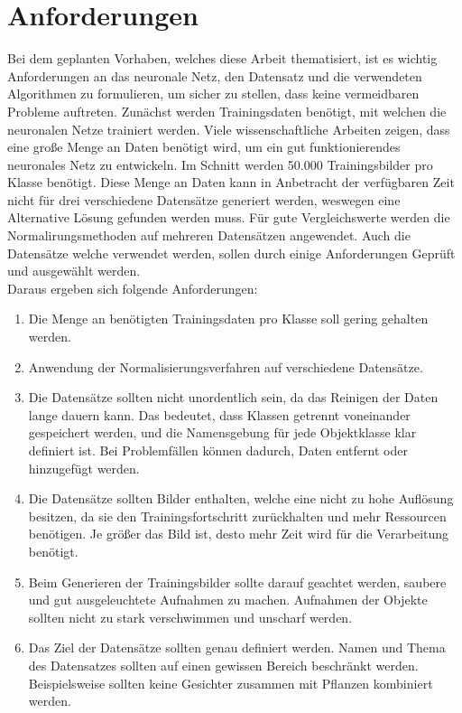 \section{Anforderungen}\label{s.anforderungen}
Bei dem geplanten Vorhaben, welches diese Arbeit thematisiert, ist es wichtig Anforderungen an das neuronale Netz, den Datensatz und die verwendeten Algorithmen zu formulieren, um sicher zu stellen, dass keine vermeidbaren Probleme auftreten. Zunächst werden Trainingsdaten benötigt, mit welchen die neuronalen Netze trainiert werden. Viele wissenschaftliche Arbeiten zeigen, dass eine große Menge an Daten benötigt wird, um ein gut funktionierendes neuronales Netz zu entwickeln. Im Schnitt werden 50.000 Trainingsbilder pro Klasse benötigt. Diese Menge an Daten kann in Anbetracht der verfügbaren Zeit nicht für drei verschiedene Datensätze generiert werden, weswegen eine Alternative Lösung gefunden werden muss. Für gute Vergleichswerte werden die Normalirungsmethoden auf mehreren Datensätzen angewendet. Auch die Datensätze welche verwendet werden, sollen durch einige Anforderungen Geprüft und ausgewählt werden.\\  
Daraus ergeben sich folgende Anforderungen:
\begin{enumerate} 
\item Die Menge an benötigten Trainingsdaten pro Klasse soll gering gehalten werden.
\item Anwendung der Normalisierungsverfahren auf verschiedene Datensätze.
\item Die Datensätze sollten nicht unordentlich sein, da das Reinigen der Daten lange dauern kann. Das bedeutet, dass Klassen getrennt voneinander gespeichert werden, und die Namensgebung für jede Objektklasse klar definiert ist. Bei Problemfällen können dadurch, Daten entfernt oder hinzugefügt werden.
\item Die Datensätze sollten Bilder enthalten, welche eine nicht zu hohe Auflösung besitzen, da sie den Trainingsfortschritt zurückhalten und mehr Ressourcen benötigen. Je größer das Bild ist, desto mehr Zeit wird für die Verarbeitung benötigt.
\item Beim Generieren der Trainingsbilder sollte darauf geachtet werden, saubere und gut ausgeleuchtete Aufnahmen zu machen. Aufnahmen der Objekte sollten nicht zu stark verschwimmen und unscharf werden. 
\item Das Ziel der Datensätze sollten genau definiert werden. Namen und Thema des Datensatzes sollten auf einen gewissen Bereich beschränkt werden. Beispielsweise sollten keine Gesichter zusammen mit Pflanzen kombiniert werden. 
\end{enumerate}

